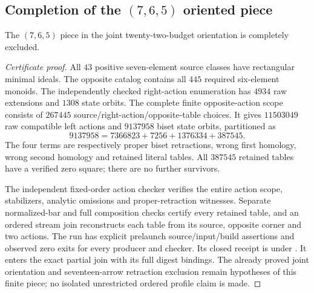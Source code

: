 \subsection{Completion of the $(7,6,5)$ oriented piece}

\begin{proposition}
\label{CP2:A-oriented-eighteen-seven-six-five}
The $(7,6,5)$ piece in the joint twenty-two-budget
orientation is completely excluded.
\end{proposition}
\begin{proof}[Certificate proof]
All $43$ positive seven-element source classes have
rectangular minimal ideals.  The opposite catalog
contains all $445$ required six-element monoids.
The independently checked right-action enumeration has
$4934$ raw extensions and $1308$ state orbits.
The complete finite opposite-action scope consists of
$267445$ source/right-action/opposite-table choices.
It gives $11503049$ raw compatible left actions and
$9137958$ biset state orbits, partitioned as
\[
 9137958=7366823+7256+1376334+387545.
\]
The four terms are respectively proper biset retractions,
wrong first homology, wrong second homology and retained
literal tables.  All $387545$ retained tables have a
verified zero square; there are no further survivors.

The independent fixed-order action checker verifies the
entire action scope, stabilizers, analytic omissions and
proper-retraction witnesses.  Separate normalized-bar
and full composition checks certify every retained table,
and an ordered stream join reconstructs each table from
its source, opposite corner and two actions.  The run has
explicit prelaunch source/input/build assertions and
observed zero exits for every producer and checker.
Its closed receipt is
 under
.
It enters the exact partial join with its full digest
bindings.  The already proved joint orientation and
seventeen-arrow retraction exclusion remain hypotheses
of this finite piece; no isolated unrestricted ordered
profile claim is made.
\end{proof}
